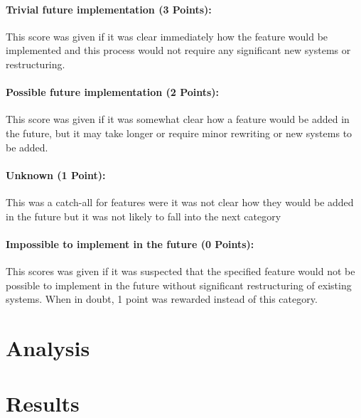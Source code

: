 \paragraph{Trivial future implementation (3 Points):} This score was given if it was clear immediately how the feature would be implemented and this process would not require any significant new systems or restructuring.

\paragraph{Possible future implementation (2 Points):} This score was given if it was somewhat clear how a feature would be added in the future, but it may take longer or require minor rewriting or new systems to be added.

\paragraph{Unknown (1 Point):} This was a catch-all for features were it was not clear how they would be added in the future but it was not likely to fall into the next category

\paragraph{Impossible to implement in the future (0 Points):} This scores was given if it was suspected that the specified feature would not be possible to implement in the future without significant restructuring of existing systems. When in doubt, 1 point was rewarded instead of this category.

\pagebreak %

\section{Analysis}






\section{Results}

